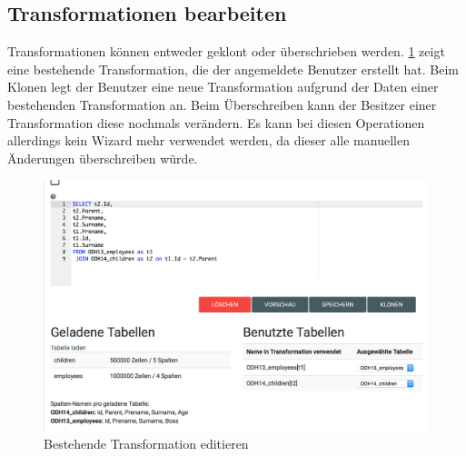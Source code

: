 \subsection{Transformationen bearbeiten}
Transformationen können entweder geklont oder überschrieben werden. \cref{fig:pd:transformation-edit} zeigt eine bestehende Transformation, die der angemeldete Benutzer erstellt hat. Beim Klonen legt der Benutzer eine neue Transformation aufgrund der Daten einer bestehenden Transformation an. Beim Überschreiben kann der Besitzer einer Transformation diese nochmals verändern. Es kann bei diesen Operationen allerdings kein Wizard mehr verwendet werden, da dieser alle manuellen Änderungen überschreiben würde.
\begin{figure}[H]
\centering
\includegraphics[width=\linewidth]{fig/transformation-edit.png}
\caption{Bestehende Transformation editieren}
\label{fig:pd:transformation-edit}
\end{figure}